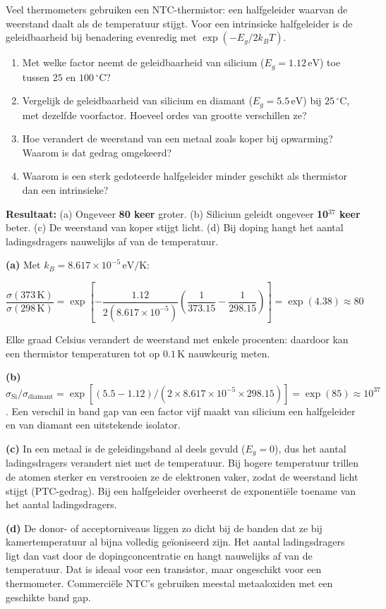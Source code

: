 \begin{oefening}
Veel thermometers gebruiken een NTC-thermistor: een halfgeleider waarvan de weerstand daalt als de temperatuur stijgt. Voor een intrinsieke halfgeleider is de geleidbaarheid bij benadering evenredig met \(\exp(-E_g/2k_BT)\).

\begin{enumerate}
\item[(a)]
  Met welke factor neemt de geleidbaarheid van silicium (\(E_g = 1.12\,\mathrm{eV}\)) toe tussen \(25\) en \(100\,^\circ\mathrm{C}\)?
\item[(b)]
  Vergelijk de geleidbaarheid van silicium en diamant (\(E_g = 5.5\,\mathrm{eV}\)) bij \(25\,^\circ\mathrm{C}\), met dezelfde voorfactor. Hoeveel ordes van grootte verschillen ze?
\item[(c)]
  Hoe verandert de weerstand van een metaal zoals koper bij opwarming? Waarom is dat gedrag omgekeerd?
\item[(d)]
  Waarom is een sterk gedoteerde halfgeleider minder geschikt als thermistor dan een intrinsieke?
\end{enumerate}
\end{oefening}
\begin{oplossing}
\textbf{Resultaat:} (a) Ongeveer \textbf{80 keer} groter. (b) Silicium geleidt ongeveer \textbf{10\ensuremath{^{37}} keer} beter. (c) De weerstand van koper stijgt licht. (d) Bij doping hangt het aantal ladingsdragers nauwelijks af van de temperatuur.

\textbf{(a)} Met \(k_B = 8.617\times10^{-5}\,\mathrm{eV/K}\):

\[
\frac{\sigma(373\,\mathrm{K})}{\sigma(298\,\mathrm{K})} = \exp\left[-\frac{1.12}{2(8.617\times10^{-5})}\left(\frac{1}{373.15}-\frac{1}{298.15}\right)\right] = \exp(4.38) \approx 80
\]

Elke graad Celsius verandert de weerstand met enkele procenten: daardoor kan een thermistor temperaturen tot op \(0.1\,\mathrm{K}\) nauwkeurig meten.

\textbf{(b)} \(\sigma_{\mathrm{Si}}/\sigma_{\text{diamant}} = \exp[(5.5-1.12)/(2 \times 8.617\times10^{-5}\times298.15)] = \exp(85) \approx 10^{37}\). Een verschil in band gap van een factor vijf maakt van silicium een halfgeleider en van diamant een uitstekende isolator.

\textbf{(c)} In een metaal is de geleidingsband al deels gevuld (\(E_g = 0\)), dus het aantal ladingsdragers verandert niet met de temperatuur. Bij hogere temperatuur trillen de atomen sterker en verstrooien ze de elektronen vaker, zodat de weerstand licht stijgt (PTC-gedrag). Bij een halfgeleider overheerst de exponentiële toename van het aantal ladingsdragers.

\textbf{(d)} De donor- of acceptorniveaus liggen zo dicht bij de banden dat ze bij kamertemperatuur al bijna volledig geïoniseerd zijn. Het aantal ladingsdragers ligt dan vast door de dopingconcentratie en hangt nauwelijks af van de temperatuur. Dat is ideaal voor een transistor, maar ongeschikt voor een thermometer. Commerciële NTC's gebruiken meestal metaaloxiden met een geschikte band gap.
\end{oplossing}
